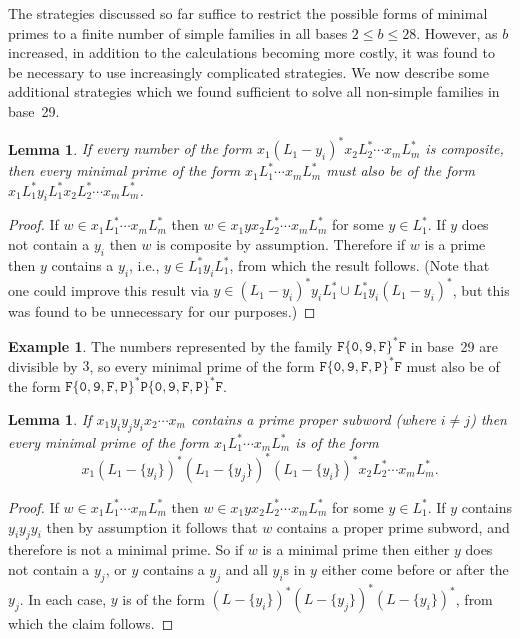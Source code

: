 \documentclass[12pt]{article}
\theoremstyle{plain}
\newtheorem{lemma}[theorem]{Lemma}
\theoremstyle{definition}
\newtheorem{example}[theorem]{Example}
\newcommand{\0}{\mathtt{0}}
\newcommand{\1}{\mathtt{1}}
\newcommand{\2}{\mathtt{2}}
\newcommand{\3}{\mathtt{3}}
\newcommand{\4}{\mathtt{4}}
\newcommand{\5}{\mathtt{5}}
\newcommand{\6}{\mathtt{6}}
\newcommand{\7}{\mathtt{7}}
\newcommand{\8}{\mathtt{8}}
\newcommand{\9}{\mathtt{9}}
\begin{document}
The strategies discussed so far suffice to restrict the possible forms of minimal primes to a finite number of simple families in all bases $2\leq b\leq 28$.
However, as $b$ increased, in addition to the calculations becoming more costly, 
it was found to be necessary to use increasingly complicated strategies.
We now describe some additional strategies which we found sufficient to solve all non-simple families in base~29.
\begin{lemma}
If every number of the form $x_1(L_1-y_i)^*x_2L_2^*\dotsm x_mL_m^*$ is composite, then
every minimal prime of the form $x_1L_1^*\dotsm x_mL_m^*$ must also be of the form
$x_1L_1^*y_iL_1^*x_2L_2^*\dotsm x_mL_m^*$.
\end{lemma}
\begin{proof}
If $w\in x_1L_1^*\dotsm x_mL_m^*$ then $w\in x_1yx_2L_2^*\dotsm x_mL_m^*$ for some $y\in L_1^*$.  If $y$ does not contain a $y_i$
then $w$ is composite by assumption.  Therefore if $w$ is a prime then $y$ contains a $y_i$, i.e., $y\in L_1^*y_iL_1^*$, from which the
result follows.
(Note that one could improve this result via $y\in(L_1-y_i)^*y_iL_1^*\cup L_1^*y_i(L_1-y_i)^*$, but this was found to be unnecessary for our purposes.)
\end{proof}
\begin{example}
The numbers represented by the family $\mathtt{F}\{\0,\9,\mathtt{F}\}^*\mathtt{F}$ in base~29 are divisible by $3$,
so every minimal prime of the form $\mathtt{F}\{\0,\9,\mathtt{F},\mathtt{P}\}^*\mathtt{F}$ must also be of the form
$\mathtt{F}\{\0,\9,\mathtt{F},\mathtt{P}\}^*\mathtt{P}\{\0,\9,\mathtt{F},\mathtt{P}\}^*\mathtt{F}$.
\end{example}
\begin{lemma}
If $x_1y_iy_jy_ix_2\dotsm x_m$ contains a prime proper subword (where $i\neq j$) then every minimal prime of the form
$x_1L_1^*\dotsm x_mL_m^*$ is of the form \[x_1(L_1-\{y_i\})^*(L_1-\{y_j\})^*(L_1-\{y_i\})^*x_2L_2^*\dotsm x_mL_m^* . \]
\end{lemma}
\begin{proof}
If $w\in x_1L_1^*\dotsm x_mL_m^*$ then $w\in x_1yx_2L_2^*\dotsm x_mL_m^*$ for some $y\in L_1^*$.
If $y$ contains $y_iy_jy_i$ then by assumption it follows that $w$ contains a proper prime subword,
and therefore is not a minimal prime.  So if $w$ is a minimal prime then either $y$ does not contain
a $y_j$, or $y$ contains a $y_j$ and all $y_i$s in $y$ either come before or after the $y_j$.
In each case, $y$ is of the form $(L-\{y_i\})^*(L-\{y_j\})^*(L-\{y_i\})^*$, from which the claim follows.
\end{proof}
\end{document}
